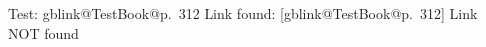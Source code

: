 \documentclass{article}
\makeatletter
\newcommand{\getgblink}[2]{\csname gblink@#1@#2\endcsname}
\newcommand{\ifgblink}[2]{%
  \ifcsname gblink@#1@#2\endcsname
    \expandafter\@firstoftwo
  \else
    \expandafter\@secondoftwo
  \fi
}
\makeatother
\begin{document}
Test: \ifgblink{TestBook}{p.~312}{
  Link found: [\getgblink{TestBook}{p.~312}]
}{
  Link NOT found
}
\end{document}
